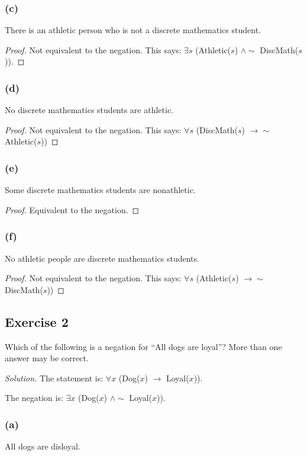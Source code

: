 \documentclass[14pt]{extarticle}
\newcommand{\fa}{\forall}
\newcommand{\te}{\exists}
\begin{document}
\subsubsection{(c)}
There is an athletic person who is not a discrete mathematics student.

\begin{proof}
    Not equivalent to the negation. This says: $\te s$ (Athletic($s$) $\wedge \sim$ DiscMath($s$)).
\end{proof}

\subsubsection{(d)}
No discrete mathematics students are athletic.

\begin{proof}
    Not equivalent to the negation. This says: $\fa s$ (DiscMath($s$) $\to \sim$ Athletic($s$))
\end{proof}

\subsubsection{(e)}
Some discrete mathematics students are nonathletic.

\begin{proof}
    Equivalent to the negation.
\end{proof}

\subsubsection{(f)}
No athletic people are discrete mathematics students.

\begin{proof}
    Not equivalent to the negation. This says: $\fa s$ (Athletic($s$) $\to \sim$ DiscMath($s$))
\end{proof}

\subsection{Exercise 2}
Which of the following is a negation for “All dogs are loyal”? More than one answer may be correct.

    {\it Solution.} The statement is: $\fa x$ (Dog($x$) $\to$ Loyal($x$)).

The negation is: $\te x$ (Dog($x$) $\wedge \sim$ Loyal($x$)).

\subsubsection{(a)}
All dogs are disloyal.
\end{document}
